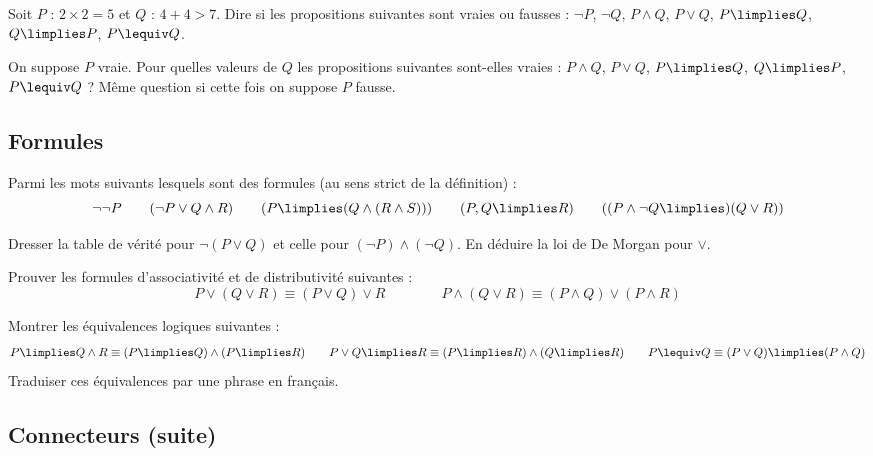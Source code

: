 \documentclass[11pt,class=report,crop=false]{standalone}
\begin{document}
\begin{exercicecours}
	Soit $P$ : \og{}$2 \times 2 = 5$\fg{} et $Q$ : \og{}$4+4 > 7$\fg{}.
	Dire si les propositions suivantes sont vraies ou fausses :
	$\lnot P$, $\lnot Q$, $P \land Q$, $P \lor Q$, $P \limplies Q$, $Q \limplies P$, $P \lequiv Q$.
\end{exercicecours}

\begin{exercicecours}
	On suppose $P$ vraie. Pour quelles valeurs de $Q$ les propositions suivantes sont-elles vraies : $P \land Q$, $P \lor Q$, $P \limplies Q$, $Q \limplies P$, $P \lequiv Q$ ? Même question si cette fois on suppose $P$ fausse.
\end{exercicecours}


\subsection*{Formules}

\begin{exercicecours}
Parmi les mots suivants lesquels sont des formules (au sens strict de la définition) :
\[\lnot \lnot P\qquad (\lnot P \lor Q \land R) \qquad (P \limplies (Q  \land (R \land S))) \qquad (P, Q \limplies R) \qquad ( (P \land \lnot Q \limplies) (Q \lor R))
\]	
\end{exercicecours}

\begin{exercicecours}
	Dresser la table de vérité pour $\lnot(P \lor Q)$ et celle pour $(\lnot P) \land (\lnot Q)$. En déduire la loi de De Morgan pour $\lor$. 
\end{exercicecours}

\begin{exercicecours}
	Prouver les formules d'associativité et de distributivité suivantes :
	\[ P \lor (Q \lor R) \equiv (P \lor Q) \lor R \qquad \qquad
	P \land (Q \lor R) \equiv (P \land Q) \lor (P \land R) \] 
\end{exercicecours}

\begin{exercicecours}
	Montrer les équivalences logiques suivantes :
	\[
	P \limplies Q \land R \equiv (P \limplies Q) \land (P \limplies R) \qquad
	P \lor Q \limplies R \equiv (P \limplies R) \land (Q \limplies R) \qquad
	P \lequiv Q \equiv (P \lor Q) \limplies (P \land Q)
	\]
	Traduiser ces équivalences par une phrase en français.
\end{exercicecours}


\subsection*{Connecteurs (suite)}
\end{document}
